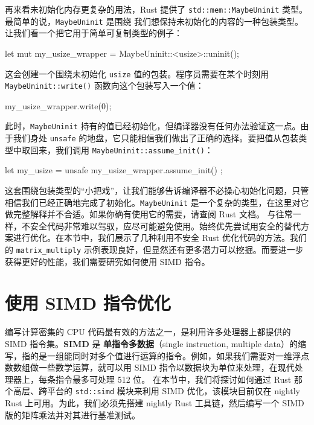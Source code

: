 再来看未初始化内存更复杂的用法，Rust 提供了
\texttt{std::\allowbreak{}mem::\allowbreak{}MaybeUninit} 类型。最简单的说，\texttt{MaybeUninit} 是围绕
\label{idx:idx_e31fe6d4}
我们想保持未初始化的内容的一种包装类型。让我们看一个把它用于简单可复制类型的例子：
\begin{codebox}[rust]
let mut my_usize_wrapper = MaybeUninit::<usize>::uninit();
\end{codebox}
这会创建一个围绕未初始化 \texttt{usize} 值的包装。程序员需要在某个时刻用 \texttt{MaybeUninit::\allowbreak{}write(\allowbreak{})\allowbreak{}} 函数向这个包装写入一个值：
\begin{codebox}[text]
my_usize_wrapper.write(0);
\end{codebox}
此时，\texttt{MaybeUninit} 持有的值已经初始化，但编译器没有任何办法验证这一点。由于我们身处 \texttt{unsafe} 的地盘，它只能相信我们做出了正确的选择。要把值从包装类型中取回来，我们调用 \texttt{MaybeUninit::\allowbreak{}assume\_\allowbreak{}init(\allowbreak{})\allowbreak{}}：
\begin{codebox}[rust]
let my_usize = unsafe { my_usize_wrapper.assume_init() };
\end{codebox}
这套围绕包装类型的“小把戏”，让我们能够告诉编译器不必操心初始化问题，只管相信我们已经正确地完成了初始化。\texttt{MaybeUninit} 是一个复杂的类型，在这里对它做完整解释并不合适。如果你确有使用它的需要，请查阅 Rust 文档。
\label{idx:idx_2e7ac7eb}
与往常一样，不安全代码非常难以驾驭，应尽可能避免使用。始终优先尝试用安全的替代方案进行优化。在本节中，我们展示了几种利用不安全 Rust 优化代码的方法。我们的 \texttt{matrix\_\allowbreak{}multiply} 示例表现良好，但显然还有更多潜力可以挖掘。而要进一步获得更好的性能，我们需要研究如何使用 SIMD 指令。
\section{使用 SIMD 指令优化}
\label{idx:idx_c76c5dac}
\label{idx:idx_cdab9a88}
编写计算密集的 CPU 代码最有效的方法之一，是利用许多处理器上都提供的 SIMD 指令集。\textbf{SIMD} 是 \textbf{单指令多数据}（single instruction,\allowbreak{} multiple data）的缩写，指的是一组能同时对多个值进行运算的指令。例如，如果我们需要对一维浮点数数组做一些数学运算，就可以用 SIMD 指令以数据块为单位来处理，在现代处理器上，每条指令最多可处理 512 位。
在本节中，我们将探讨如何通过 Rust 那个高层、跨平台的 \texttt{std::simd} 模块来利用 SIMD 优化，该模块目前仅在 nightly Rust 上可用。为此，我们必须先搭建 nightly Rust 工具链，然后编写一个 SIMD 版的矩阵乘法并对其进行基准测试。
